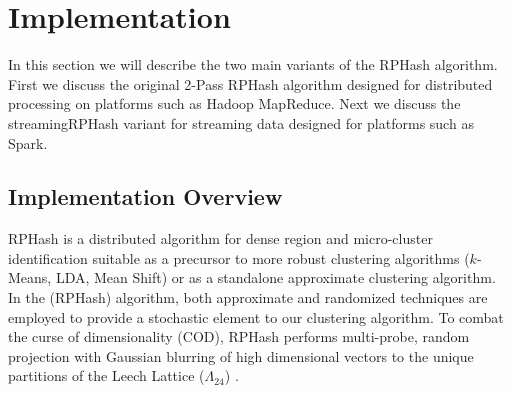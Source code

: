 






\chapter{Implementation}\label{secrphash}

In this section we will describe the two main variants of the \textsf{RPHash} algorithm.  First we discuss the original
\textsf{2-Pass RPHash} algorithm designed for distributed processing on platforms such as Hadoop MapReduce.  Next we
discuss the \textsf{streamingRPHash} variant for streaming data designed for platforms such as Spark.

\section{Implementation Overview}

\textsf{RPHash} is a distributed algorithm for dense region and micro-cluster identification suitable as a precursor to
more robust clustering algorithms ($k$-Means, LDA, Mean Shift) or as a standalone approximate clustering algorithm.  In
the (\textsf{RPHash}) algorithm, both approximate and randomized techniques are employed to provide a stochastic element
to our clustering algorithm.  To combat the curse of dimensionality (COD), \textsf{RPHash} performs multi-probe, random
projection with Gaussian blurring of high dimensional vectors to the unique partitions of the Leech Lattice
($\Lambda_{24}$) \cite{Andoni}.

